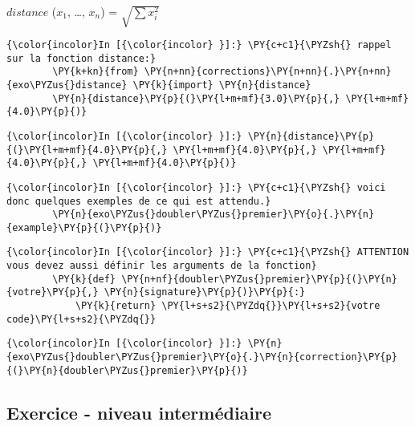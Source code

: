 \(distance\) (\(x_1\), \ldots{}, \(x_n\)) = \(\sqrt{\sum x_i^2}\)

    \begin{Verbatim}[commandchars=\\\{\}]
{\color{incolor}In [{\color{incolor} }]:} \PY{c+c1}{\PYZsh{} rappel sur la fonction distance:}
        \PY{k+kn}{from} \PY{n+nn}{corrections}\PY{n+nn}{.}\PY{n+nn}{exo\PYZus{}distance} \PY{k}{import} \PY{n}{distance}
        \PY{n}{distance}\PY{p}{(}\PY{l+m+mf}{3.0}\PY{p}{,} \PY{l+m+mf}{4.0}\PY{p}{)}
\end{Verbatim}


    \begin{Verbatim}[commandchars=\\\{\}]
{\color{incolor}In [{\color{incolor} }]:} \PY{n}{distance}\PY{p}{(}\PY{l+m+mf}{4.0}\PY{p}{,} \PY{l+m+mf}{4.0}\PY{p}{,} \PY{l+m+mf}{4.0}\PY{p}{,} \PY{l+m+mf}{4.0}\PY{p}{)}
\end{Verbatim}


    \begin{Verbatim}[commandchars=\\\{\}]
{\color{incolor}In [{\color{incolor} }]:} \PY{c+c1}{\PYZsh{} voici donc quelques exemples de ce qui est attendu.}
        \PY{n}{exo\PYZus{}doubler\PYZus{}premier}\PY{o}{.}\PY{n}{example}\PY{p}{(}\PY{p}{)}
\end{Verbatim}


    \begin{Verbatim}[commandchars=\\\{\}]
{\color{incolor}In [{\color{incolor} }]:} \PY{c+c1}{\PYZsh{} ATTENTION vous devez aussi définir les arguments de la fonction}
        \PY{k}{def} \PY{n+nf}{doubler\PYZus{}premier}\PY{p}{(}\PY{n}{votre}\PY{p}{,} \PY{n}{signature}\PY{p}{)}\PY{p}{:}
            \PY{k}{return} \PY{l+s+s2}{\PYZdq{}}\PY{l+s+s2}{votre code}\PY{l+s+s2}{\PYZdq{}}
\end{Verbatim}


    \begin{Verbatim}[commandchars=\\\{\}]
{\color{incolor}In [{\color{incolor} }]:} \PY{n}{exo\PYZus{}doubler\PYZus{}premier}\PY{o}{.}\PY{n}{correction}\PY{p}{(}\PY{n}{doubler\PYZus{}premier}\PY{p}{)}
\end{Verbatim}


    \hypertarget{exercice---niveau-intermuxe9diaire}{%
\subsection{Exercice - niveau
intermédiaire}\label{exercice---niveau-intermuxe9diaire}}

